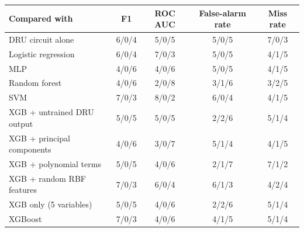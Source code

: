 \begin{tabular}{lcccc}
\toprule
Compared with & F1 & ROC AUC & False-alarm rate & Miss rate \\
\midrule
DRU circuit alone & 6/0/4 & 5/0/5 & 5/0/5 & 7/0/3 \\
Logistic regression & 6/0/4 & 7/0/3 & 5/0/5 & 4/1/5 \\
MLP & 4/0/6 & 4/0/6 & 5/0/5 & 4/1/5 \\
Random forest & 4/0/6 & 2/0/8 & 3/1/6 & 3/2/5 \\
SVM & 7/0/3 & 8/0/2 & 6/0/4 & 4/1/5 \\
XGB + untrained DRU output & 5/0/5 & 5/0/5 & 2/2/6 & 5/1/4 \\
XGB + principal components & 4/0/6 & 3/0/7 & 5/1/4 & 4/1/5 \\
XGB + polynomial terms & 5/0/5 & 4/0/6 & 2/1/7 & 7/1/2 \\
XGB + random RBF features & 7/0/3 & 6/0/4 & 6/1/3 & 4/2/4 \\
XGB only (5 variables) & 5/0/5 & 4/0/6 & 2/2/6 & 5/1/4 \\
XGBoost & 7/0/3 & 4/0/6 & 4/1/5 & 5/1/4 \\
\bottomrule
\end{tabular}
